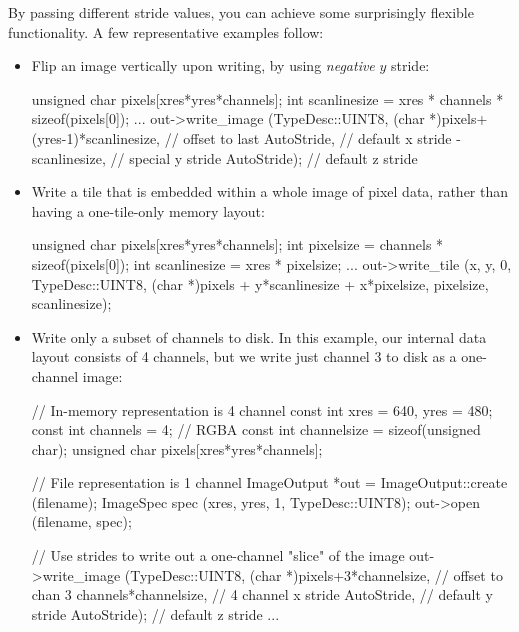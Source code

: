 By passing different stride values, you can achieve some surprisingly
flexible functionality.  A few representative examples follow:

\begin{itemize}
\item Flip an image vertically upon writing, by using \emph{negative}
  $y$ stride:
  \begin{code}
        unsigned char pixels[xres*yres*channels];
        int scanlinesize = xres * channels * sizeof(pixels[0]);
        ...
        out->write_image (TypeDesc::UINT8,
                          (char *)pixels+(yres-1)*scanlinesize, // offset to last
                          AutoStride,                  // default x stride
                          -scanlinesize,               // special y stride
                          AutoStride);                 // default z stride
  \end{code}
\item Write a tile that is embedded within a whole image of pixel data,
  rather than having a one-tile-only memory layout:
  \begin{code}
        unsigned char pixels[xres*yres*channels];
        int pixelsize = channels * sizeof(pixels[0]);
        int scanlinesize = xres * pixelsize;
        ...
        out->write_tile (x, y, 0, TypeDesc::UINT8,
                         (char *)pixels + y*scanlinesize + x*pixelsize,
                         pixelsize,
                         scanlinesize);
  \end{code}
\item Write only a subset of channels to disk.  In this example, our
  internal data layout consists of 4 channels, but we write just 
  channel 3 to disk as a one-channel image:
  \begin{code}
        // In-memory representation is 4 channel
        const int xres = 640, yres = 480;
        const int channels = 4;  // RGBA
        const int channelsize = sizeof(unsigned char);
        unsigned char pixels[xres*yres*channels];

        // File representation is 1 channel
        ImageOutput *out = ImageOutput::create (filename);
        ImageSpec spec (xres, yres, 1, TypeDesc::UINT8);
        out->open (filename, spec);

        // Use strides to write out a one-channel "slice" of the image
        out->write_image (TypeDesc::UINT8,
                          (char *)pixels+3*channelsize, // offset to chan 3
                          channels*channelsize,         // 4 channel x stride
                          AutoStride,                   // default y stride
                          AutoStride);                  // default z stride
        ...
  \end{code}
\end{itemize}

